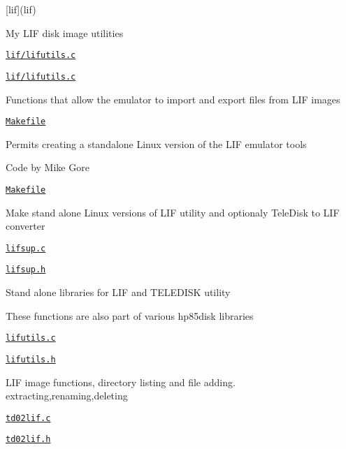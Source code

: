 \begin{DoxyItemize}
\item \mbox{[}lif\mbox{]}(lif)
\begin{DoxyItemize}
\item My L\+IF disk image utilities
\item \href{lif/lifutils.c}{\tt lif/lifutils.\+c}
\item \href{lif/lifutils.c}{\tt lif/lifutils.\+c}
\begin{DoxyItemize}
\item Functions that allow the emulator to import and export files from L\+IF images
\end{DoxyItemize}
\item \href{lif/Makefile}{\tt Makefile}
\begin{DoxyItemize}
\item Permits creating a standalone Linux version of the L\+IF emulator tools
\end{DoxyItemize}
\item Code by Mike Gore
\begin{DoxyItemize}
\item \href{lif/Makefile}{\tt Makefile}
\begin{DoxyItemize}
\item Make stand alone Linux versions of L\+IF utility and optionaly Tele\+Disk to L\+IF converter
\end{DoxyItemize}
\item \href{lif/lifsup.c}{\tt lifsup.\+c}
\item \href{lif/lifsup.h}{\tt lifsup.\+h}
\begin{DoxyItemize}
\item Stand alone libraries for L\+IF and T\+E\+L\+E\+D\+I\+SK utility
\begin{DoxyItemize}
\item These functions are also part of various hp85disk libraries
\end{DoxyItemize}
\end{DoxyItemize}
\item \href{lif/lifutils.c}{\tt lifutils.\+c}
\item \href{lif/lifutils.h}{\tt lifutils.\+h}
\begin{DoxyItemize}
\item L\+IF image functions, directory listing and file adding. extracting,renaming,deleting
\end{DoxyItemize}
\item \href{lif/td02lif.c}{\tt td02lif.\+c}
\item \href{lif/td02lif.h}{\tt td02lif.\+h}

\end{DoxyItemize}
\end{DoxyItemize}
\end{DoxyItemize}
